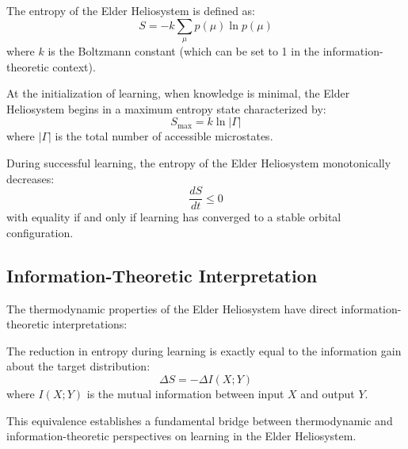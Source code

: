 \begin{definition}
The entropy of the Elder Heliosystem is defined as:
\begin{equation}
S = -k \sum_{\mu} p(\mu) \ln p(\mu)
\end{equation}
where $k$ is the Boltzmann constant (which can be set to 1 in the information-theoretic context).
\end{definition}

\begin{theorem}
At the initialization of learning, when knowledge is minimal, the Elder Heliosystem begins in a maximum entropy state characterized by:
\begin{equation}
S_{\text{max}} = k \ln |\Gamma|
\end{equation}
where $|\Gamma|$ is the total number of accessible microstates.
\end{theorem}

\begin{theorem}
During successful learning, the entropy of the Elder Heliosystem monotonically decreases:
\begin{equation}
\frac{dS}{dt} \leq 0
\end{equation}
with equality if and only if learning has converged to a stable orbital configuration.
\end{theorem}

\subsection{Information-Theoretic Interpretation}

The thermodynamic properties of the Elder Heliosystem have direct information-theoretic interpretations:

\begin{theorem}
The reduction in entropy during learning is exactly equal to the information gain about the target distribution:
\begin{equation}
\Delta S = -\Delta I(X;Y)
\end{equation}
where $I(X;Y)$ is the mutual information between input $X$ and output $Y$.
\end{theorem}

This equivalence establishes a fundamental bridge between thermodynamic and information-theoretic perspectives on learning in the Elder Heliosystem.

